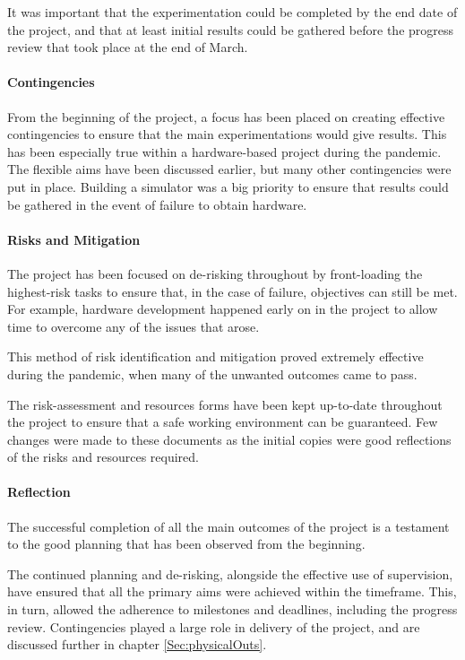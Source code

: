 It was important that the experimentation could be completed by the end date of the project, and that at least initial results could be gathered before the progress review that took place at the end of March.

\paragraph{Contingencies}
From the beginning of the project, a focus has been placed on creating effective contingencies to ensure that the main experimentations would give results. This has been especially true within a hardware-based project during the pandemic. The flexible aims have been discussed earlier, but many other contingencies were put in place. Building a simulator was a big priority to ensure that results could be gathered in the event of failure to obtain hardware.

\paragraph{Risks and Mitigation}
The project has been focused on de-risking throughout by front-loading the highest-risk tasks to ensure that, in the case of failure, objectives can still be met. For example, hardware development happened early on in the project to allow time to overcome any of the issues that arose.

This method of risk identification and mitigation proved extremely effective during the pandemic, when many of the unwanted outcomes came to pass.

The risk-assessment and resources forms have been kept up-to-date throughout the project to ensure that a safe working environment can be guaranteed. Few changes were made to these documents as the initial copies were good reflections of the risks and resources required.

\paragraph{Reflection}
The successful completion of all the main outcomes of the project is a testament to the good planning that has been observed from the beginning.

The continued planning  and de-risking, alongside the effective use of supervision, have ensured that all the primary aims were achieved within the timeframe. This, in turn, allowed the adherence to milestones and deadlines, including the progress review. Contingencies played a large role in delivery of the project, and are discussed further in chapter \ref{Sec:physicalOuts}.

